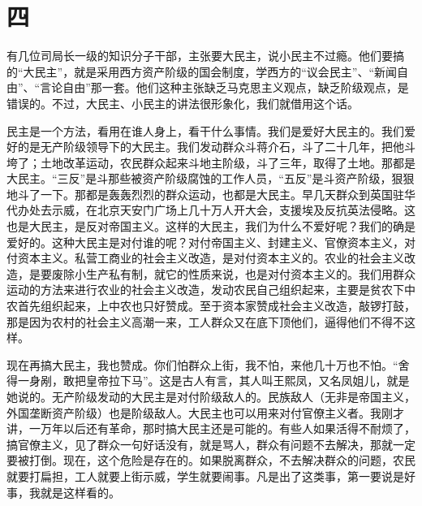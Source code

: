 \section*{四}

有几位司局长一级的知识分子干部，主张要大民主，说小民主不过瘾。他们要搞的“大民主”，就是采用西方资产阶级的国会制度，学西方的“议会民主”、“新闻自由”、“言论自由”那一套。他们这种主张缺乏马克思主义观点，缺乏阶级观点，是错误的。不过，大民主、小民主的讲法很形象化，我们就借用这个话。

民主是一个方法，看用在谁人身上，看干什么事情。我们是爱好大民主的。我们爱好的是无产阶级领导下的大民主。我们发动群众斗蒋介石，斗了二十几年，把他斗垮了；土地改革运动，农民群众起来斗地主阶级，斗了三年，取得了土地。那都是大民主。“三反”是斗那些被资产阶级腐蚀的工作人员，“五反”是斗资产阶级，狠狠地斗了一下。那都是轰轰烈烈的群众运动，也都是大民主。早几天群众到英国驻华代办处去示威，在北京天安门广场上几十万人开大会，支援埃及反抗英法侵略。这也是大民主，是反对帝国主义。这样的大民主，我们为什么不爱好呢？我们的确是爱好的。这种大民主是对付谁的呢？对付帝国主义、封建主义、官僚资本主义，对付资本主义。私营工商业的社会主义改造，是对付资本主义的。农业的社会主义改造，是要废除小生产私有制，就它的性质来说，也是对付资本主义的。我们用群众运动的方法来进行农业的社会主义改造，发动农民自己组织起来，主要是贫农下中农首先组织起来，上中农也只好赞成。至于资本家赞成社会主义改造，敲锣打鼓，那是因为农村的社会主义高潮一来，工人群众又在底下顶他们，逼得他们不得不这样。

现在再搞大民主，我也赞成。你们怕群众上街，我不怕，来他几十万也不怕。“舍得一身剐，敢把皇帝拉下马”。这是古人有言，其人叫王熙凤，又名凤姐儿，就是她说的。无产阶级发动的大民主是对付阶级敌人的。民族敌人（无非是帝国主义，外国垄断资产阶级）也是阶级敌人。大民主也可以用来对付官僚主义者。我刚才讲，一万年以后还有革命，那时搞大民主还是可能的。有些人如果活得不耐烦了，搞官僚主义，见了群众一句好话没有，就是骂人，群众有问题不去解决，那就一定要被打倒。现在，这个危险是存在的。如果脱离群众，不去解决群众的问题，农民就要打扁担，工人就要上街示威，学生就要闹事。凡是出了这类事，第一要说是好事，我就是这样看的。

